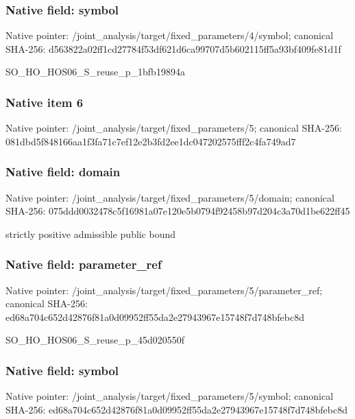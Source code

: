 \documentclass[10pt,a4paper]{article}
\begin{document}
\subsubsection{Native field: symbol}
Native pointer: /joint\_\allowbreak{}analysis/target/fixed\_\allowbreak{}parameters/4/symbol; canonical SHA-256: d563822a02ff1cd27784f53df621d6ca99707d5b602115ff5a93bf409fe81d1f

\begingroup\raggedright\sloppy SO\_\allowbreak{}HO\_\allowbreak{}HOS06\_\allowbreak{}S\_\allowbreak{}reuse\_\allowbreak{}p\_\allowbreak{}1bfb19894a\par\endgroup

\subsubsection{Native item 6}
Native pointer: /joint\_\allowbreak{}analysis/target/fixed\_\allowbreak{}parameters/5; canonical SHA-256: 081dbd5f848166aa1f3fa71c7ef12e2b3fd2ee1dc047202575fff2c4fa749ad7

\subsubsection{Native field: domain}
Native pointer: /joint\_\allowbreak{}analysis/target/fixed\_\allowbreak{}parameters/5/domain; canonical SHA-256: 075ddd0032478c5f16981a07e120e5b0794f92458b97d204c3a70d1be622ff45

\begingroup\raggedright\sloppy strictly positive admissible public bound\par\endgroup

\subsubsection{Native field: parameter\_\allowbreak{}ref}
Native pointer: /joint\_\allowbreak{}analysis/target/fixed\_\allowbreak{}parameters/5/parameter\_\allowbreak{}ref; canonical SHA-256: ed68a704c652d42876f81a0d09952ff55da2e27943967e15748f7d748bfebc8d

\begingroup\raggedright\sloppy SO\_\allowbreak{}HO\_\allowbreak{}HOS06\_\allowbreak{}S\_\allowbreak{}reuse\_\allowbreak{}p\_\allowbreak{}45d020550f\par\endgroup

\subsubsection{Native field: symbol}
Native pointer: /joint\_\allowbreak{}analysis/target/fixed\_\allowbreak{}parameters/5/symbol; canonical SHA-256: ed68a704c652d42876f81a0d09952ff55da2e27943967e15748f7d748bfebc8d
\end{document}
